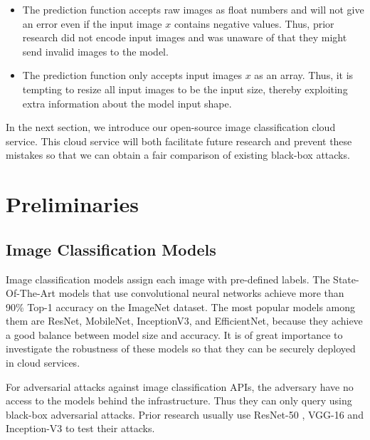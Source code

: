 \begin{itemize}
    \item The prediction function accepts raw images as float numbers and will not give an error even if the input image $x$ contains negative values. Thus, prior research did not encode input images and was unaware of that they might send invalid images to the model.
    \item The prediction function only accepts input images $x$ as an array. Thus, it is tempting to resize all input images to be the input size, thereby exploiting extra information about the model input shape.
\end{itemize}


In the next section, we introduce our open-source image classification cloud service. This cloud service will both facilitate future research and prevent these mistakes so that we can obtain a fair comparison of existing black-box attacks.

\section{Preliminaries}

\subsection{Image Classification Models}

Image classification models assign each image with pre-defined labels. The State-Of-The-Art models that use convolutional neural networks achieve more than 90\% Top-1 accuracy on the ImageNet dataset. The most popular models among them are ResNet, MobileNet, InceptionV3, and EfficientNet, because they achieve a good balance between model size and accuracy. It is of great importance to investigate the robustness of these models so that they can be securely deployed in cloud services. 

For adversarial attacks against image classification APIs, the adversary have no access to the models behind the infrastructure. Thus they can only query using black-box adversarial attacks. Prior research usually use ResNet-50 \citep{he2016deep}, VGG-16 \citep{simonyan2014very} and Inception-V3 \citep{szegedy2016rethinking} to test their attacks.

